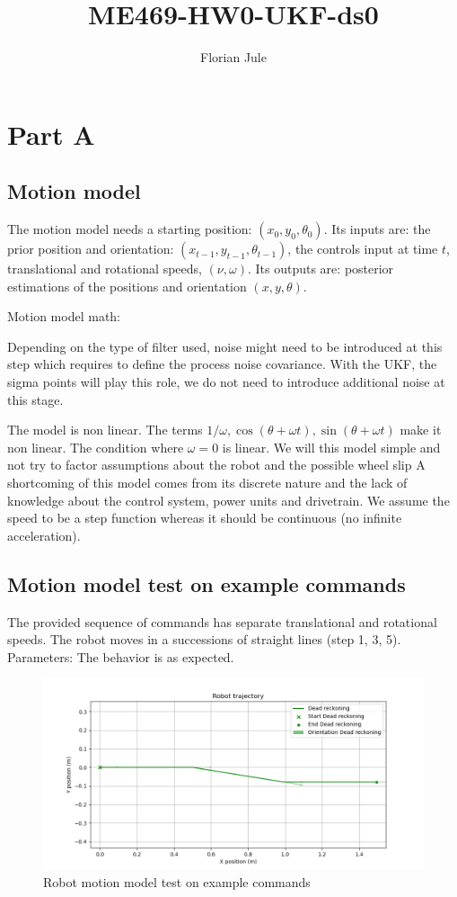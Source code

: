 \documentclass{article}
\title{ME469-HW0-UKF-ds0}
\author{Florian Jule}
\begin{document}
\maketitle

\section{Part A}
\subsection{Motion model}
The motion model needs a starting position: $(x_0, y_0, \theta_0)$. 
Its inputs are: the prior position and orientation: $(x_{t-1}, y_{t-1}, \theta_{t-1})$, the controls input at time $t$, translational and rotational speeds, $(\nu,\omega)$. 
Its outputs are: posterior estimations of the positions and orientation $(x, y, \theta)$.

Motion model math:

Depending on the type of filter used, noise might need to be introduced at this step which requires to define the process noise covariance. With the UKF, the sigma points will play this role, we do not need to introduce additional noise at this stage.


The model is non linear. The terms $1/\omega, \cos(\theta+\omega t), \sin(\theta+\omega t)$ make it non linear. The  condition where $\omega=0$ is linear.
We will this model simple and not try to factor assumptions about the robot and the possible wheel slip
A shortcoming of this model comes from its discrete nature and the lack of knowledge about the control system, power units and drivetrain. We assume the speed to be a step function whereas it should be continuous (no infinite acceleration).

\subsection{Motion model test on example commands}
The provided sequence of commands has separate translational and rotational speeds. The robot moves in a successions of straight lines (step 1, 3, 5).
Parameters:
The behavior is as expected.

\begin{figure}
\centering
\includegraphics[width=\textwidth]{Figure_1.png}
\caption{Robot motion model test on example commands}
\end{figure}
\end{document}
